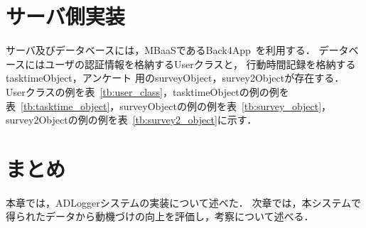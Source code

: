 \section{サーバ側実装}
サーバ及びデータベースには，MBaaSであるBack4App~\cite{back4app}を利用する．
データベースにはユーザの認証情報を格納するUserクラスと， 行動時間記録を格納するtasktimeObject，アンケート 用のsurveyObject，survey2Objectが存在する．
Userクラスの例を表~\ref{tb:user_class}，tasktimeObjectの例の例を表~\ref{tb:tasktime_object}，surveyObjectの例の例を表~\ref{tb:survey_object}，survey2Objectの例の例を表~\ref{tb:survey2_object}に示す．

\section{まとめ}
本章では，ADLoggerシステムの実装について述べた．
次章では，本システムで得られたデータから動機づけの向上を評価し，考察について述べる．
